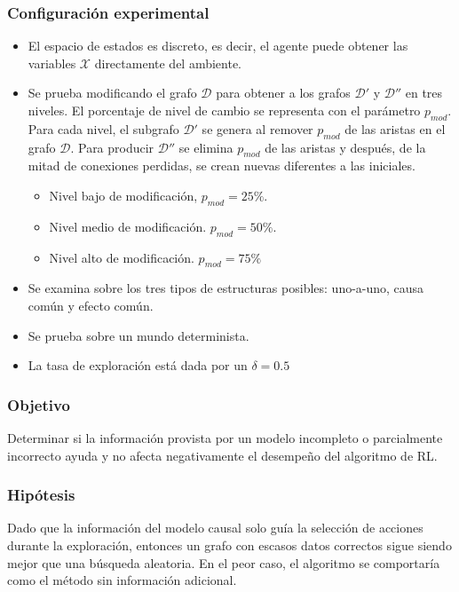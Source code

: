 \subsubsection{Configuración experimental}

\begin{itemize}
    \item El espacio de estados es discreto, es decir, el agente puede
    obtener las variables $\mathcal{X}$ directamente del ambiente.
    \item Se prueba modificando el grafo $\mathcal{D}$ para obtener a los
    grafos $\mathcal{D'}$ y $\mathcal{D''}$ en tres niveles. El porcentaje de nivel de cambio se representa con el parámetro $p_{mod}$.
    Para cada nivel, el subgrafo $\mathcal{D'}$ se genera al remover $p_{mod}$ de las aristas en el grafo $\mathcal{D}$. Para producir $\mathcal{D''}$ se elimina $p_{mod}$ de las aristas y después, de la mitad de conexiones perdidas, se crean nuevas diferentes a las iniciales.
    \begin{itemize}
        \item Nivel bajo de modificación, $p_{mod} = 25 \%$.
        \item Nivel medio de modificación. $p_{mod} = 50 \%$.
        \item Nivel alto de modificación. $p_{mod} = 75 \%$
    \end{itemize}
    \item Se examina sobre los tres tipos de estructuras posibles: uno-a-uno, 
    causa común y efecto común. 
    \item Se prueba sobre un mundo determinista.
    
    \item La tasa de exploración está dada por un $\delta = 0.5$
\end{itemize}

\subsubsection{Objetivo}

Determinar si la información provista por un modelo
incompleto o parcialmente incorrecto ayuda y no
afecta negativamente el desempeño del algoritmo de RL.

\subsubsection{Hipótesis}

Dado que la información del modelo causal solo guía la selección
de acciones durante la exploración, entonces un grafo con escasos
datos correctos sigue siendo mejor que una búsqueda aleatoria. En el
peor caso, el algoritmo se comportaría como el método sin información adicional.


